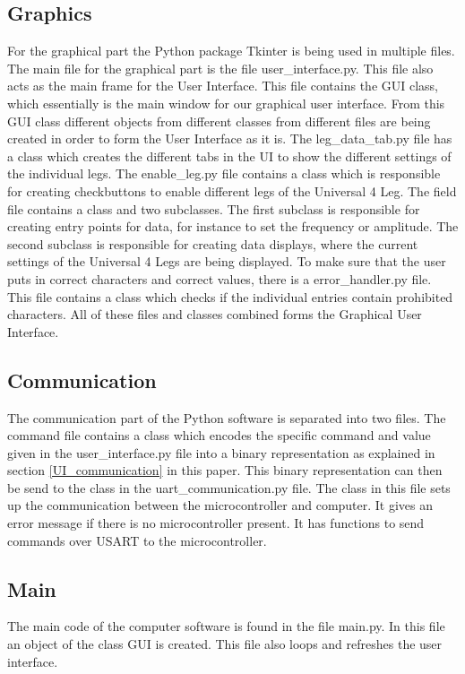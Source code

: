 \documentclass[conference]{IEEEtran}
\begin{document}
\subsection{Graphics}
For the graphical part the Python package Tkinter is being used in multiple files. The main file for the graphical part is the file user\_interface.py. This file also acts as the main frame for the User Interface. This file contains the GUI class, which essentially is the main window for our graphical user interface. From this GUI class different objects from different classes from different files are being created in order to form the User Interface as it is. The leg\_data\_tab.py file has a class which creates the different tabs in the UI to show the different settings of the individual legs. The enable\_leg.py file contains a class which is responsible for creating checkbuttons to enable different legs of the Universal 4 Leg. The field file contains a class and two subclasses. The first subclass is responsible for creating entry points for data, for instance to set the frequency or amplitude. The second subclass is responsible for creating data displays, where the current settings of the Universal 4 Legs are being displayed. To make sure that the user puts in correct characters and correct values, there is a error\_handler.py file. This file contains a class which checks if the individual entries contain prohibited characters. All of these files and classes combined forms the Graphical User Interface.

\subsection{Communication}
The communication part of the Python software is separated into two files. The command file contains a class which encodes the specific command and value given in the user\_interface.py file into a binary representation as explained in section \ref{UI_communication} in this paper. This binary representation can then be send to the class in the uart\_communication.py file. The class in this file sets up the communication between the microcontroller and computer. It gives an error message if there is no microcontroller present. It has functions to send commands over USART to the microcontroller.

\subsection{Main}
The main code of the computer software is found in the file main.py. In this file an object of the class GUI is created. This file also loops and refreshes the user interface.
\end{document}
